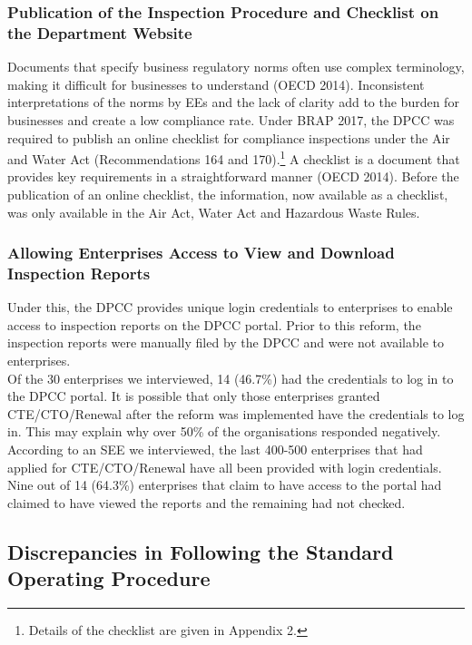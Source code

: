 \documentclass[a4paper, 12pt]{article}
\begin{document}
	\subsubsection{ Publication of the Inspection Procedure and Checklist on the Department Website}
	
	Documents that specify business regulatory norms often use complex terminology, making it difficult for businesses to understand (OECD 2014). Inconsistent interpretations of the norms by EEs and the lack of clarity add to the burden for businesses and create a low compliance rate. Under BRAP 2017, the DPCC was required to publish an online checklist for compliance inspections under the Air and Water Act (Recommendations 164 and 170).\footnote{Details of the checklist are given in Appendix 2.} A checklist is a document that provides key requirements in a straightforward manner (OECD 2014). Before the publication of an online checklist, the information, now available as a checklist, was only available in the Air Act, Water Act and Hazardous Waste Rules. \\
	
	\subsubsection{Allowing Enterprises Access to View and Download Inspection Reports}
	
	Under this, the DPCC provides unique login credentials to enterprises to enable access to inspection reports on the DPCC portal. Prior to this reform, the inspection reports were manually filed by the DPCC and were not available to enterprises. \\
	
	Of the 30 enterprises we interviewed, 14 (46.7\%) had the credentials to log in to the DPCC portal. It is possible that only those enterprises granted CTE/CTO/Renewal after the reform was implemented have the credentials to log in. This may explain why over 50\% of the organisations responded negatively. According to an SEE we interviewed, the last 400-500 enterprises that had applied for CTE/CTO/Renewal have all been provided with login credentials. \\
	
	Nine out of 14 (64.3\%) enterprises that claim to have access to the portal had claimed to have viewed the reports and the remaining had not checked. \\
	
	\subsection{Discrepancies in Following the Standard Operating Procedure}
	
\end{document}
